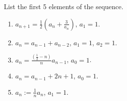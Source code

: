 List the first 5 elements of the sequence. 
\begin{multicols}{2}
\begin{enumerate}
\item $\displaystyle a_{n+1}=\frac{1}{2}\left(a_n+ \frac{3}{a_n}\right)$, $a_1=1$.
\item $\displaystyle a_n=a_{n-1}+a_{n-2}$, $a_1=1$, $a_2=1$.
\item $\displaystyle a_n= \frac{\left(\frac{1}{2}-n\right)}{n} a_{n-1} $, $a_0=1$.
\item $\displaystyle a_n= a_{n-1}+2n+1$, $a_0=1$.
\item $\displaystyle a_n:=\frac{1}{n} a_n$, $a_1=1$.
\end{enumerate}
\end{multicols}